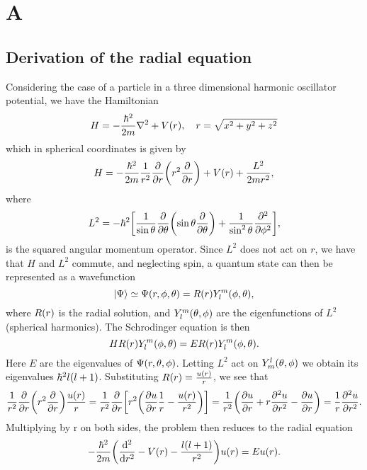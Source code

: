 \onecolumn
\setcounter{equation}{0}
\renewcommand\theequation{A.\arabic{equation}}
\section*{A}
\label{sec:appendix}

\subsection*{Derivation of the radial equation}
\label{sec:radeq}
Considering the case of a particle in a three dimensional harmonic oscillator
potential, we have the Hamiltonian
  \begin{equation}
    H = -\frac{\hbar^2}{2m}\laplacian + V\qty(r), \quad r = \sqrt{x^2 + y^2 + z^2}
  \end{equation}
which in spherical coordinates is given by
  \begin{equation}
    H = -\frac{\hbar^2}{2m}\frac{1}{r^2}\pdv{}{r}\qty(r^2\pdv{}{r}) + V\qty(r) + \frac{L^2}{2mr^2},
  \end{equation}
where
  \begin{equation}
    L^2 = -\hbar^2 \qty[\frac{1}{\sin\theta}\pdv{}{\theta}\qty(\sin{\theta}\pdv{\theta})
    + \frac{1}{\sin^2\theta}\pdv[2]{}{\phi}],
  \end{equation}
is the squared angular momentum operator. Since $L^2$ does not act on
$r$, we have that $H$ and $L^2$ commute, and neglecting spin, a quantum state can
then be represented as a wavefunction
  \begin{equation}
    \ket{\Psi} \simeq \Psi\qty(r, \phi, \theta) = R\qty(r)Y_{l}^m\qty(\phi, \theta),
  \end{equation}
where $R\qty(r)$ is the radial solution, and $Y_{l}^m\qty(\theta, \phi)$ are the
eigenfunctions of $L^2$ (spherical harmonics).
The Schrodinger equation is then
  \begin{equation}
    HR\qty(r)Y_{l}^m\qty(\phi, \theta) = ER\qty(r)Y_{l}^m\qty(\phi, \theta).
  \end{equation}
Here $E$ are the eigenvalues of $\Psi\qty(r, \theta, \phi)$. Letting $L^2$ act on $Y_{m}^l\qty(\theta, \phi)$ we obtain
its eigenvalues $\hbar^2 l\qty(l+1)$. Substituting $R\qty(r) = \frac{u\qty(r)}{r}$,
we see that
  \[
    \frac{1}{r^2}\pdv{}{r}\qty(r^2\pdv{}{r})\frac{u\qty(r)}{r}
    = \frac{1}{r^2}\pdv{}{r}\qty[r^2\qty(\pdv{u}{r}\frac{1}{r} - \frac{u\qty(r)}{r^2})]
    = \frac{1}{r^2}\qty(\pdv{u}{r} + r\pdv[2]{u}{r} - \pdv{u}{r}) = \frac{1}{r}\pdv[2]{u}{r}.
  \]
Multiplying by r on both sides, the problem then reduces to the radial equation
\begin{equation}
  -\frac{\hbar^2}{2m}\qty(\dv[2]{}{r} - V(r) - \frac{l\qty(l+1)}{r^2})u\qty(r) = Eu\qty(r).
\end{equation}

